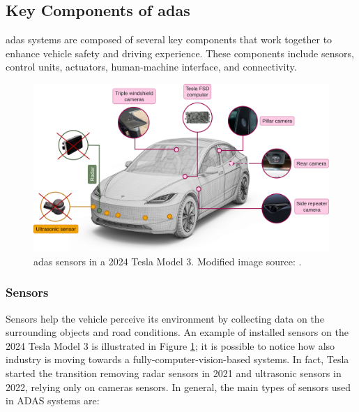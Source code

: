 \subsection{Key Components of \acs{adas}}
\ac{adas} systems are composed of several key components that work together to 
enhance vehicle safety and driving experience. These components include sensors, 
control units, actuators, human-machine interface, and connectivity.
\begin{figure}
    \centering
    \includegraphics[width=\textwidth]{images/introduction/tesla_sensors.png}
    \caption[Components of an ADAS system]
    {\acs{adas} sensors in a 2024 Tesla Model 3. Modified image source: 
    \cite{mantangcg_2024_tesla_model_3}.}
    \label{fig:adas_components}
\end{figure}

\subsubsection*{Sensors}
Sensors help the vehicle perceive its environment by collecting data on the 
surrounding objects and road conditions. An example of installed sensors on the 
2024 Tesla Model 3 is illustrated in Figure \ref{fig:adas_components}; it is 
possible to notice how also industry is moving towards a fully-computer-vision-based
systems. In fact, Tesla started the transition removing radar sensors in 2021 and 
ultrasonic sensors in 2022, relying only on cameras sensors.
In general, the main types of sensors used in ADAS systems are:

